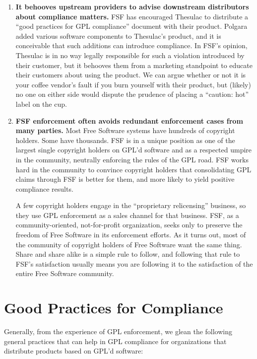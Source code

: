 {\begin{enumerate}
\item {\bf It behooves upstream providers to advise downstream
  distributors about compliance matters.}  FSF has encouraged Thesulac to
  distribute a ``good practices for GPL compliance'' document with their
  product. Polgara added various software components to Thesulac's
  product, and it is conceivable that such additions can introduce
  compliance. In FSF's opinion, Thesulac is in no way legally responsible
  for such a violation introduced by their customer, but it behooves them
  from a marketing standpoint to educate their customers about using the
  product. We can argue whether or not it is your coffee vendor's fault
  if you burn yourself with their product, but (likely) no one on either
  side would dispute the prudence of placing a ``caution: hot'' label on
  the cup.

\item {\bf FSF enforcement often avoids redundant enforcement cases from
  many parties.}  Most Free Software systems have hundreds of copyright
  holders. Some have thousands. FSF is in a unique position as one of
  the largest single copyright holders on GPL'd software and as a
  respected umpire in the community, neutrally enforcing the rules of the
  GPL road. FSF works hard in the community to convince copyright
  holders that consolidating GPL claims through FSF is better for them,
  and more likely to yield positive compliance results.

  A few copyright holders engage in the ``proprietary relicensing''
  business, so they use GPL enforcement as a sales channel for that
  business. FSF, as a community-oriented, not-for-profit organization,
  seeks only to preserve the freedom of Free Software in its enforcement
  efforts. As it turns out, most of the community of copyright holders
  of Free Software want the same thing. Share and share alike is a
  simple rule to follow, and following that rule to FSF's satisfaction
  usually means you are following it to the satisfaction of the entire
  Free Software community.

\end{enumerate}

\chapter{Good Practices for Compliance}

Generally, from the experience of GPL enforcement, we glean the following
general practices that can help in GPL compliance for organizations that
distribute products based on GPL'd software:

}
